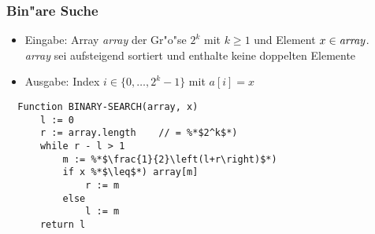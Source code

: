 \documentclass[t]{beamer}
\begin{document}
\begin{frame}[fragile]
  \frametitle{Bin"are Suche}
  \begin{itemize}
  \item Eingabe: Array \emph{array} der Gr"o"se $2^k$ mit $k \geq 1$ und Element
                 $x \in \text{\emph{array}}$. \\
                 \emph{array} sei aufsteigend sortiert und enthalte
                 keine doppelten Elemente
  \item Ausgabe: Index $i \in \{0,\ldots,2^k-1\}$ mit $a[i] = x$
  \end{itemize}
  \begin{lstlisting}
  Function BINARY-SEARCH(array, x)
      l := 0
      r := array.length    // = %*$2^k$*)
      while r - l > 1
          m := %*$\frac{1}{2}\left(l+r\right)$*)
          if x %*$\leq$*) array[m]
              r := m
          else
              l := m
      return l
  \end{lstlisting}
\end{frame}
\end{document}
